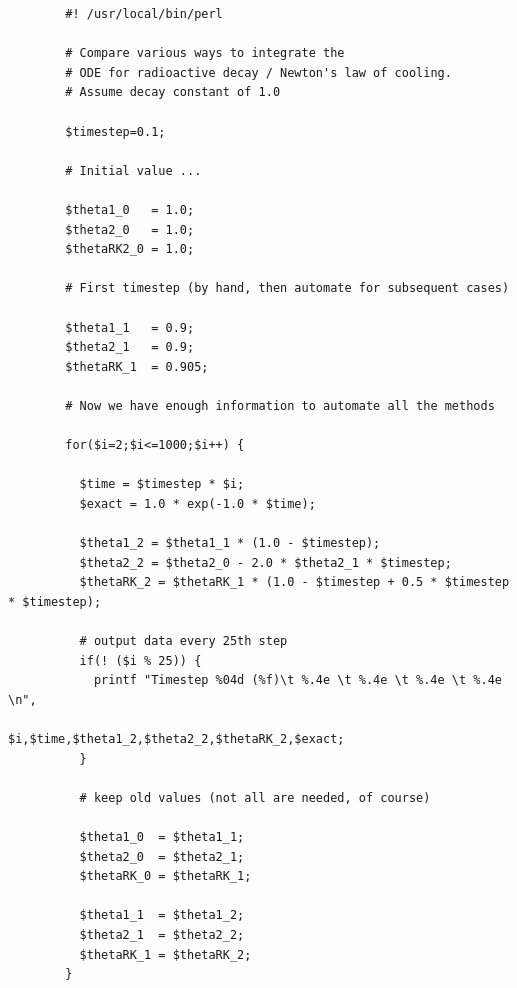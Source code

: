 \documentclass[10pt]{article}
\begin{document}
	{\footnotesize
		\begin{verbatim}
		#! /usr/local/bin/perl
		
		# Compare various ways to integrate the 
		# ODE for radioactive decay / Newton's law of cooling.
		# Assume decay constant of 1.0
		
		$timestep=0.1;
		
		# Initial value ... 
		
		$theta1_0   = 1.0;
		$theta2_0   = 1.0;
		$thetaRK2_0 = 1.0;
		
		# First timestep (by hand, then automate for subsequent cases)
		
		$theta1_1   = 0.9;
		$theta2_1   = 0.9;
		$thetaRK_1  = 0.905;
		
		# Now we have enough information to automate all the methods 
		
		for($i=2;$i<=1000;$i++) {
		
		  $time = $timestep * $i;
		  $exact = 1.0 * exp(-1.0 * $time);
		
		  $theta1_2 = $theta1_1 * (1.0 - $timestep);
		  $theta2_2 = $theta2_0 - 2.0 * $theta2_1 * $timestep;
		  $thetaRK_2 = $thetaRK_1 * (1.0 - $timestep + 0.5 * $timestep * $timestep);
		
		  # output data every 25th step
		  if(! ($i % 25)) {
		    printf "Timestep %04d (%f)\t %.4e \t %.4e \t %.4e \t %.4e \n",
		    			$i,$time,$theta1_2,$theta2_2,$thetaRK_2,$exact;
		  }
		
		  # keep old values (not all are needed, of course)
		
		  $theta1_0  = $theta1_1;
		  $theta2_0  = $theta2_1;
		  $thetaRK_0 = $thetaRK_1;
		
		  $theta1_1  = $theta1_2;
		  $theta2_1  = $theta2_2;
		  $thetaRK_1 = $thetaRK_2;
		}
		

\end{verbatim}}
\end{document}
